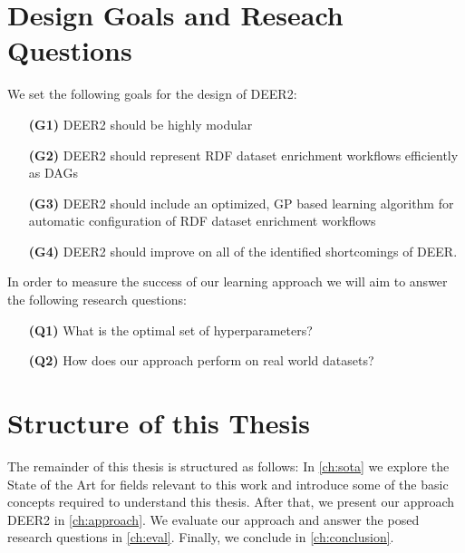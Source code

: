 \section{Design Goals and Reseach Questions}
\label{sec:goals}
We set the following goals for the design of \ac{DEER2}:

\begin{itemize}
  \item[\textbf{(G1)}] \ac{DEER2} should be highly modular
  \item[\textbf{(G2)}] \ac{DEER2} should represent \ac{RDF} dataset enrichment workflows efficiently as \acp{DAG}
  \item[\textbf{(G3)}] \ac{DEER2} should include an optimized, \ac{GP} based learning algorithm for automatic configuration of \ac{RDF} dataset enrichment workflows
  \item[\textbf{(G4)}] \ac{DEER2} should improve on all of the identified shortcomings of \ac{DEER}.
\end{itemize}

\noindent
In order to measure the success of our learning approach we will aim to answer the following research questions:

\begin{itemize}
  \item[\textbf{(Q1)}] What is the optimal set of hyperparameters?
  \item[\textbf{(Q2)}] How does our approach perform on real world datasets?
\end{itemize}

\section{Structure of this Thesis}
\label{sec:structure}
The remainder of this thesis is structured as follows:
In \autoref{ch:sota} we explore the State of the Art for fields relevant to this work and introduce some of the basic concepts required to understand this thesis.
After that, we present our approach \ac{DEER2} in \autoref{ch:approach}.
We evaluate our approach and answer the posed research questions in \autoref{ch:eval}.
Finally, we conclude in \autoref{ch:conclusion}.






